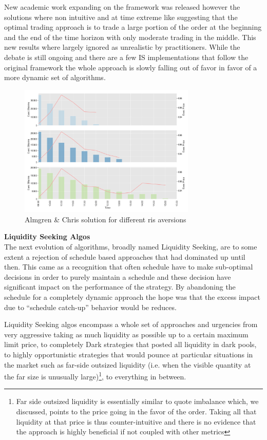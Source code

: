 New academic work expanding on the framework was released however the solutions where non intuitive and at time extreme like suggesting that the optimal trading approach is to trade a large portion of the order at the beginning and the end of the time horizon with only moderate trading in the middle. This new results where largely ignored as unrealistic by practitioners. While the debate is still ongoing and there are a few IS implementations that follow the original framework the whole approach is slowly falling out of favor in favor of a more dynamic set of algorithms. 

	\begin{figure}[!ht]
	\centering
	\includegraphics[width=0.75\textwidth]{chapters/chapter_exec_models/figures/is.png} 
	\caption{Almgren \& Chris solution for different ris aversions \label{fig:is}}
	\end{figure}



\noindent\textbf{Liquidity Seeking Algos} \\


The next evolution of algorithms, broadly named Liquidity Seeking, are to some extent a rejection of schedule based approaches that had dominated up until then. This came as a recognition that often schedule have to make sub-optimal decisions in order to purely maintain a schedule and these decision have significant impact on the performance of the strategy. By abandoning the schedule for a completely dynamic approach the hope was that the excess impact due to ``schedule catch-up'' behavior would be reduces.


Liquidity Seeking algos encompass a whole set of approaches and urgencies from very aggressive taking as much liquidity as possible up to a certain maximum limit price, to completely Dark strategies that posted all liquidity in dark pools, to highly opportunistic strategies that would pounce at particular situations in the market such as far-side outsized liquidity (i.e. when the visible quantity at the far size is unusually large)\footnote{Far side outsized liquidity is essentially similar to quote imbalance which, we discussed, points to the price going in the favor of the order. Taking all that liquidity at that price is thus counter-intuitive and there is no evidence that the approach is highly beneficial if not coupled with other metrics}, to everything in between.


